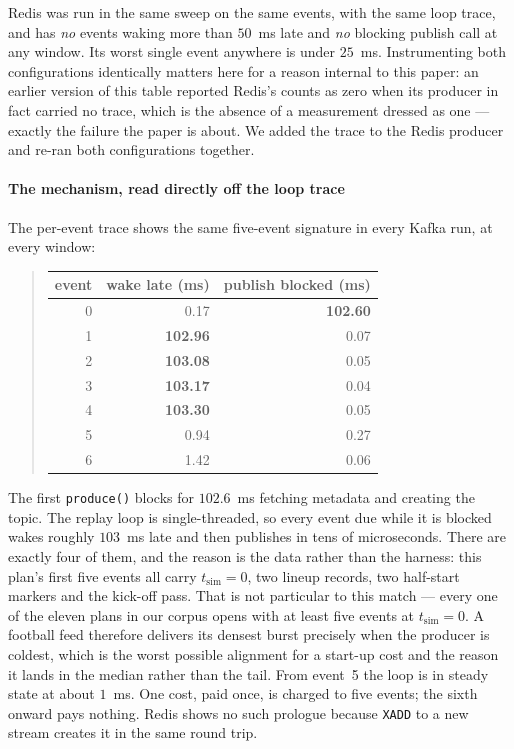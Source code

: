 \documentclass[10pt,journal,onecolumn]{IEEEtran}
\newcommand{\kafka}{Kafka}
\newcommand{\redis}{Redis}
\begin{document}
\redis{} was run in the same sweep on the same events, with the same loop trace, and has
\emph{no} events waking more than $50$~ms late and \emph{no} blocking publish call at any window. Its
worst single event anywhere is under $25$~ms. Instrumenting both configurations identically matters here for
a reason internal to this paper: an earlier version of this table reported \redis{}'s counts as
zero when its producer in fact carried no trace, which is the absence of a measurement dressed as
one --- exactly the failure the paper is about. We added the trace to the \redis{} producer and
re-ran both configurations together.

\paragraph{The mechanism, read directly off the loop trace} The per-event trace shows the same
five-event signature in every \kafka{} run, at every window:

\begin{quote}
\small
\begin{tabular}{rrr}
\toprule
event & wake late (ms) & publish blocked (ms) \\
\midrule
0 & 0.17 & \textbf{102.60} \\
1 & \textbf{102.96} & 0.07 \\
2 & \textbf{103.08} & 0.05 \\
3 & \textbf{103.17} & 0.04 \\
4 & \textbf{103.30} & 0.05 \\
5 & 0.94 & 0.27 \\
6 & 1.42 & 0.06 \\
\bottomrule
\end{tabular}
\end{quote}

The first \texttt{produce()} blocks for $102.6$~ms fetching metadata and creating the topic. The
replay loop is single-threaded, so every event due while it is blocked wakes roughly $103$~ms
late and then publishes in tens of microseconds. There are exactly four of them, and the reason is
the data rather than the harness: this plan's first five events all carry
$t_{\mathrm{sim}}{=}0$, two lineup records, two half-start markers and the kick-off pass. That
is not particular to this match --- every one of the eleven plans
in our corpus opens with at least five events at $t_{\mathrm{sim}}{=}0$. A football feed
therefore delivers its densest burst precisely when the producer is coldest, which is the worst
possible alignment for a start-up cost and the reason it lands in the median rather than the
tail. From event~5 the loop is in steady state at about $1$~ms. One cost, paid once, is charged
to five events; the sixth onward pays nothing. \redis{} shows no such prologue because
\texttt{XADD} to a new stream creates it in the same round trip.
\end{document}
